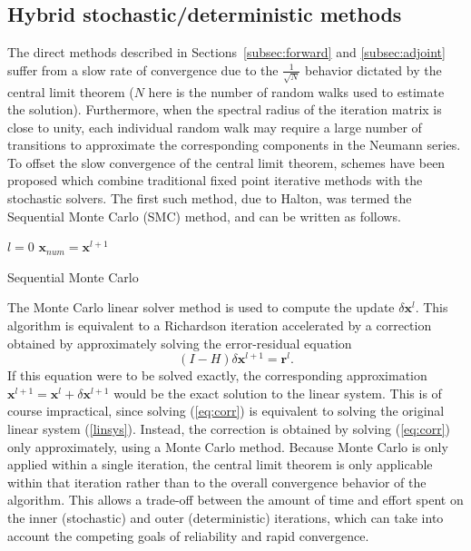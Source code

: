 \documentclass[times]{nlaauth}
\begin{document}
\subsection{Hybrid stochastic/deterministic methods}

The direct methods described in Sections~\ref{subsec:forward} and
\ref{subsec:adjoint} suffer from a slow rate of convergence due to the
$\frac{1}{\sqrt{N}}$ behavior dictated by the central limit theorem ($N$ here
is the number of random walks used to estimate the solution).  Furthermore,
when the spectral radius of the iteration matrix is close to unity, each
individual random walk may require a large number of transitions to
approximate the corresponding components in the Neumann series.
To offset the slow convergence of the central limit theorem, schemes have
been proposed which combine traditional fixed point iterative methods with
the stochastic solvers.  The first such method, due to Halton, was termed
the Sequential Monte Carlo (SMC) method, and can be written as follows.

\begin{algorithm}[H]
 \LinesNumbered
 $l=0$\;
 $\mathbf{x}_{num}=\mathbf{x}^{l+1}$\;
 \caption{Sequential Monte Carlo}
\end{algorithm}


The Monte Carlo linear solver method is used to compute the update $\delta
\mathbf{x}^{l}$.  This algorithm is equivalent to a Richardson iteration
accelerated by a correction obtained by approximately solving the error-residual
equation
\begin{equation}
(I - H)\delta \mathbf{x}^{l+1} = \mathbf{r}^{l}.
\label{eq:corr}
\end{equation}
If this equation were to be solved exactly, the corresponding approximation
$\mathbf{x}^{l+1}=\mathbf{x}^{l}+\delta \mathbf{x}^{l+1}$ would be the exact
solution to the linear system. This is of course impractical, since solving
(\ref{eq:corr}) is equivalent to solving the original linear system
(\ref{linsys}). Instead, the correction is obtained by
solving (\ref{eq:corr}) only approximately, using a Monte Carlo method.
Because Monte Carlo is only applied within a single iteration, the central
limit theorem is only applicable within that iteration rather than to
the overall convergence behavior of the algorithm. This allows a trade-off
between the amount of time and effort spent on the inner (stochastic) and
outer (deterministic) iterations, which can take into account the competing goals
of reliability and rapid convergence.
\end{document}
